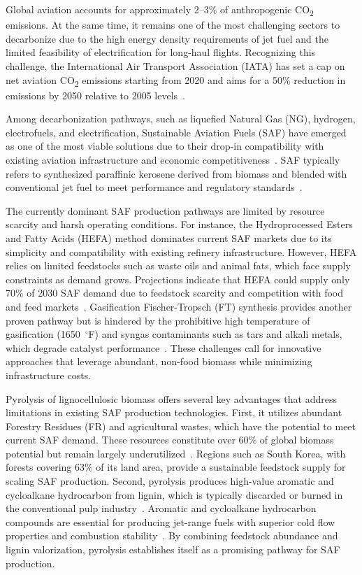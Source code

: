 Global aviation accounts for approximately 2--3\% of anthropogenic CO\textsubscript{2} emissions. At the same time, it remains one of the most challenging sectors to decarbonize due to the high energy density requirements of jet fuel and the limited feasibility of electrification for long-haul flights. Recognizing this challenge, the International Air Transport Association (IATA) has set a cap on net aviation CO\textsubscript{2} emissions starting from 2020 and aims for a 50\% reduction in emissions by 2050 relative to 2005 levels~\cite{iata2021netzero}.

Among decarbonization pathways, such as liquefied Natural Gas (NG), hydrogen, electrofuels, and electrification, Sustainable Aviation Fuels (SAF) have emerged as one of the most viable solutions due to their drop-in compatibility with existing aviation infrastructure and economic competitiveness~\cite{atsonios2015alternative}. SAF typically refers to synthesized paraffinic kerosene derived from biomass and blended with conventional jet fuel to meet performance and regulatory standards~\cite{doliente2020bio}.

The currently dominant SAF production pathways are limited by resource scarcity and harsh operating conditions. For instance, the Hydroprocessed Esters and Fatty Acids (HEFA) method dominates current SAF markets due to its simplicity and compatibility with existing refinery infrastructure. However, HEFA relies on limited feedstocks such as waste oils and animal fats, which face supply constraints as demand grows. Projections indicate that HEFA could supply only 70\% of 2030 SAF demand due to feedstock scarcity and competition with food and feed markets~\cite{doliente2020bio}. Gasification Fischer-Tropsch (FT) synthesis provides another proven pathway but is hindered by the prohibitive high temperature of gasification (1650~$^{\circ}$F) and syngas contaminants such as tars and alkali metals, which degrade catalyst performance~\cite{jones2013process}. These challenges call for innovative approaches that leverage abundant, non-food biomass while minimizing infrastructure costs.

Pyrolysis of lignocellulosic biomass offers several key advantages that address limitations in existing SAF production technologies. First, it utilizes abundant Forestry Residues (FR) and agricultural wastes, which have the potential to meet current SAF demand. These resources constitute over 60\% of global biomass potential but remain largely underutilized~\cite{wang2019biomass}. Regions such as South Korea, with forests covering 63\% of its land area, provide a sustainable feedstock supply for scaling SAF production. 
Second, pyrolysis produces high-value aromatic and cycloalkane hydrocarbon from lignin, which is typically discarded or burned in the conventional pulp industry~\cite{son2022hybrid}. Aromatic and cycloalkane hydrocarbon compounds are essential for producing jet-range fuels with superior cold flow properties and combustion stability~\cite{escalante2022evaluation}. By combining feedstock abundance and lignin valorization, pyrolysis establishes itself as a promising pathway for SAF production.

